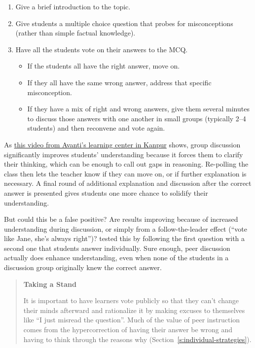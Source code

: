\begin{enumerate}
\item
  Give a brief introduction to the topic.
\item
  Give students a multiple choice question that probes for
  misconceptions (rather than simple factual knowledge).
\item
  Have all the students vote on their answers to the MCQ.

  \begin{itemize}
  \item
    If the students all have the right answer, move on.
  \item
    If they all have the same wrong answer, address that specific
    misconception.
  \item
    If they have a mix of right and wrong answers, give them several
    minutes to discuss those answers with one another in small
    groups (typically 2--4 students) and then reconvene and vote
    again.
  \end{itemize}
\end{enumerate}

As \href{https://www.youtube.com/watch?v=2LbuoxAy56o}{this video from Avanti's learning center in
Kanpur} shows, group discussion significantly
improves students' understanding because it forces them to clarify
their thinking, which can be enough to call out gaps in
reasoning. Re-polling the class then lets the teacher know if they can
move on, or if further explanation is necessary. A final round of
additional explanation and discussion after the correct answer is
presented gives students one more chance to solidify their
understanding.

But could this be a false positive? Are results improving because of
increased understanding during discussion, or simply from a
follow-the-leader effect (``vote like Jane, she's always right'')?
\cite{Smit2009} tested this by following the first question with a
second one that students answer individually. Sure enough, peer
discussion actually does enhance understanding, even when none of the
students in a discussion group originally knew the correct answer.

\begin{quote}\setlength{\parindent}{0pt}
\textbf{Taking a Stand}

It is important to have learners vote publicly so that they can't
change their minds afterward and rationalize it by making excuses to
themselves like ``I just misread the question''. Much of the value of
peer instruction comes from the hypercorrection of having their answer
be wrong and having to think through the reasons why
(Section~\ref{s:individual-strategies}).
\end{quote}

